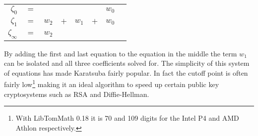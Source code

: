 \documentclass[b5paper]{book}
\begin{document}
\begin{center}
\begin{tabular}{rcrcrcrc}
$\zeta_{0}$ &      $=$ &  &  &  & & $w_0$ \\
$\zeta_{1}$ &      $=$ & $w_2$ & $+$ & $w_1$ & $+$ & $w_0$ \\
$\zeta_{\infty}$ & $=$ & $w_2$ &  & &  & \\
\end{tabular}
\end{center}

By adding the first and last equation to the equation in the middle the term $w_1$ can be isolated and all three coefficients solved for.  The simplicity
of this system of equations has made Karatsuba fairly popular.  In fact the cutoff point is often fairly low\footnote{With LibTomMath 0.18 it is 70 and 109 digits for the Intel P4 and AMD Athlon respectively.}
making it an ideal algorithm to speed up certain public key cryptosystems such as RSA and Diffie-Hellman.  
\end{document}
